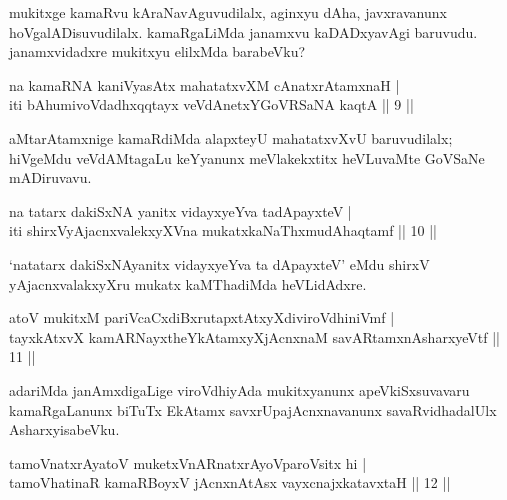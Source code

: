 \begin{artha}
mukitxge kamaRvu kAraNavAguvudilalx, aginxyu dAha, javxravanunx 
hoVgalADisuvudilalx. kamaRgaLiMda janamxvu kaDADxyavAgi baruvudu. 
janamxvidadxre mukitxyu elilxMda barabeVku?
\end{artha}


\begin{shl}
na kamaRNA kaniVyasAtx mahatatxvXM cAnatxrAtamxnaH | \\
iti bAhumivoVdadhxqqtayx veVdAnetxYGoVRSaNA kaqtA \hfill|| 9  || 
\end{shl}

\begin{artha}
aMtarAtamxnige kamaRdiMda alapxteyU mahatatxvXvU baruvudilalx; hiVgeMdu veVdAMtagaLu keYyanunx meVlakekxtitx heVLuvaMte GoVSaNe mADiruvavu.
\end{artha}


\begin{shl}
na tatarx dakiSxNA yanitx vidayxyeYva tadApayxteV | \\
iti shirxVyAjacnxvalekxyXVna mukatxkaNaThxmudAhaqtamf \hfill || 10 || 
\end{shl}

\begin{artha}
`natatarx dakiSxNAyanitx vidayxyeYva ta dApayxteV' eMdu shirxV yAjacnxvalakxyXru mukatx kaMThadiMda heVLidAdxre.
\end{artha}

\begin{shl}
atoV mukitxM pariVcaCxdiBxrutapxtAtxyXdiviroVdhiniVmf | \\
tayxkAtxvX kamARNayxtheYkAtamxyXjAcnxnaM savARtamxnA\s \s sharxyeVtf \hfill|| 11 || 
\end{shl}

\begin{artha}
adariMda janAmxdigaLige viroVdhiyAda mukitxyanunx apeVkiSxsuvavaru 
kamaRgaLanunx biTuTx EkAtamx savxrUpajAcnxnavanunx savaRvidhadalUlx 
AsharxyisabeVku.
\end{artha}


\begin{shl}
tamoVnatxrAyatoV muketxVnARnatxrAyoV\s paroV\s sitx hi | \\
tamoVhatinaR kamaRBoyxV jAcnxnAtAsx vayxcnajxkatavxtaH \hfill|| 12 || 
\end{shl}

